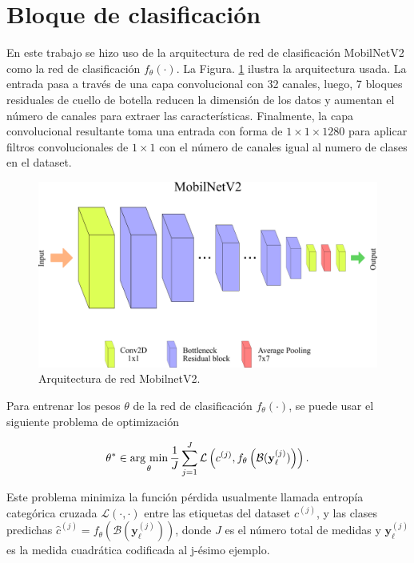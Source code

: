 \section{Bloque de clasificación}

En este trabajo se hizo uso de la arquitectura de red de clasificación MobilNetV2  como la red de clasificación $f_\theta(\cdot)$. La Figura. \ref{fig:mobilnetv2} ilustra la arquitectura usada. La entrada pasa a través de una capa convolucional con 32 canales, luego, 7 bloques residuales de cuello de botella reducen la dimensión de los datos y aumentan el número de canales para extraer las características. Finalmente, la capa convolucional resultante toma una entrada con forma de $1\times1\times1280$ para aplicar filtros convolucionales de $1\times1$ con el número de canales igual al numero de clases en el dataset.

\begin{figure}[!h]
    \centering
    \includegraphics[width=1\linewidth]{images/MobilNet.pdf}
    \caption{Arquitectura de red MobilnetV2.}
    \label{fig:mobilnetv2}
\end{figure}

Para entrenar los pesos $\theta$ de la red de clasificación $f_\theta(\cdot)$, se puede usar el siguiente problema de optimización

\begin{equation}
    \mathbf{\theta}^* \in  \operatorname*{arg \ min}_{\mathbf{\theta}} \frac{1}{J}\sum_{j = 1}^{J} \mathcal{L}\left( c^{(j)}, f_{\mathbf{\theta}}\left(\mathcal{B}(\mathbf{y}_{\ell}^{(j)})\right)\right).
    \label{eq:dl_optimization}
\end{equation}

Este problema minimiza la función pérdida usualmente llamada entropía categórica cruzada $\mathcal{L}(\cdot, \cdot)$ entre las etiquetas del dataset $c^{(j)}$, y las clases predichas $\hat{c}^{(j)} = f_\theta(\mathcal{B}(\mathbf{y}_\ell^{(j)}))$, donde $J$ es el número total de medidas y $\mathbf{y}_\ell^{(j)}$ es la medida cuadrática codificada al  j-ésimo ejemplo.
